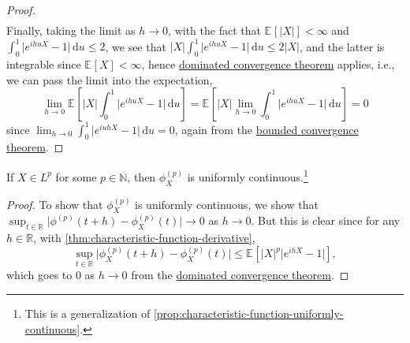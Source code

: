 \begin{proof}
\[\begin{split}
		\end{split}
	\]
	Finally, taking the limit as \(h \to 0\), with the fact that \(\mathbb{E}_{}[\vert X \vert ] < \infty \) and \(\int_{0}^{1} \vert e^{i hu X} - 1 \vert \,\mathrm{d}u \leq 2\), we see that \(\vert X \vert \int_{0}^{1} \vert e^{ihuX} - 1 \vert \,\mathrm{d}u \leq 2 \vert X \vert \), and the latter is integrable since \(\mathbb{E}_{}[X] < \infty \), hence \href{https://en.wikipedia.org/wiki/Dominated_convergence_theorem}{dominated convergence theorem} applies, i.e., we can pass the limit into the expectation,
	\[
		\lim_{h \to 0} \mathbb{E}_{}\left[\vert X \vert \int_{0}^{1} \vert e^{ihuX} - 1 \vert \,\mathrm{d}u \right]
		= \mathbb{E}_{}\left[\vert X \vert \lim_{h \to 0} \int_{0}^{1} \vert e^{ihuX} - 1 \vert \,\mathrm{d}u \right]
		= 0
	\]
	since \(\lim_{h \to 0} \int_{0}^{1} \vert e^{iuhX} - 1\vert \,\mathrm{d}u = 0\), again from the \href{https://en.wikipedia.org/wiki/Dominated_convergence_theorem}{bounded convergence theorem}.
\end{proof}

\begin{corollary}\label{col:characteristic-function-derivative-uniform-continuous}
	If \(X \in L^p\) for some \(p \in \mathbb{N} \), then \(\phi _X^{(p)}\) is uniformly continuous.\footnote{This is a generalization of \autoref{prop:characteristic-function-uniformly-continuous}.}
\end{corollary}
\begin{proof}
	To show that \(\phi _X^{(p)}\) is uniformly continuous, we show that \(\sup _{t\in \mathbb{R} } \vert \phi ^{(p)}(t + h) - \phi _X^{(p)}(t) \vert \to 0\) as \(h \to 0\). But this is clear since for any \(h \in \mathbb{R} \), with \autoref{thm:characteristic-function-derivative},
	\[
		\sup _{t\in \mathbb{R} } \vert \phi _X^{(p)} (t + h) - \phi _X^{(p)}(t) \vert
		\leq \mathbb{E}_{}\left[\vert X \vert ^p \vert e^{ih X} - 1\vert \right],
	\]
	which goes to \(0\) as \(h \to 0\) from the \href{https://en.wikipedia.org/wiki/Dominated_convergence_theorem}{dominated convergence theorem}.
\end{proof}